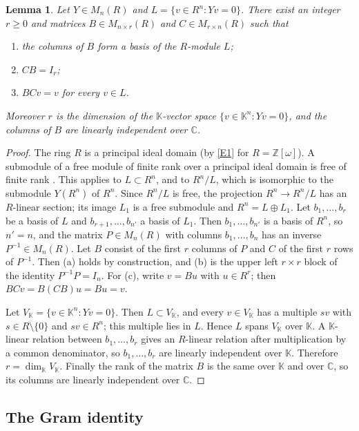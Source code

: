\documentclass[11pt,a4paper]{article}
\newtheorem{lemma}[theorem]{Lemma}
\theoremstyle{remark}
\newcommand{\ZZ}{\mathbb{Z}}
\newcommand{\CC}{\mathbb{C}}
\newcommand{\KK}{\mathbb{K}}
\begin{document}
\begin{lemma}\label{lem:basis}
Let $Y\in M_n(R)$ and $L=\{v\in R^n : Yv=0\}$. There exist an integer $r\ge0$ and matrices $B\in M_{n\times r}(R)$
and $C\in M_{r\times n}(R)$ such that
\begin{enumerate}[label=(\alph*)]
\item the columns of $B$ form a basis of the $R$-module $L$;
\item $CB=I_r$;
\item $BCv=v$ for every $v\in L$.
\end{enumerate}
Moreover $r$ is the dimension of the $\KK$-vector space $\{v\in\KK^n : Yv=0\}$, and the columns of $B$ are linearly
independent over $\CC$.
\end{lemma}
\begin{proof}
The ring $R$ is a principal ideal domain (by \ref{E1} for $R=\ZZ[\omega]$). A submodule of a free module of finite
rank over a principal ideal domain is free of finite rank \cite[Chapter~III, \S7]{La}. This applies to
$L\subset R^n$, and to $R^n/L$, which is isomorphic to the submodule $Y(R^n)$ of $R^n$. Since $R^n/L$ is free, the
projection $R^n\to R^n/L$ has an $R$-linear section; its image $L_1$ is a free submodule and $R^n=L\oplus L_1$. Let
$b_1,\dots,b_r$ be a basis of $L$ and $b_{r+1},\dots,b_{n'}$ a basis of $L_1$. Then $b_1,\dots,b_{n'}$ is a basis of
$R^n$, so $n'=n$, and the matrix $P\in M_n(R)$ with columns $b_1,\dots,b_n$ has an inverse $P^{-1}\in M_n(R)$. Let
$B$ consist of the first $r$ columns of $P$ and $C$ of the first $r$ rows of $P^{-1}$. Then (a) holds by
construction, and (b) is the upper left $r\times r$ block of the identity $P^{-1}P=I_n$. For (c), write $v=Bu$ with
$u\in R^r$; then $BCv=B(CB)u=Bu=v$.

Let $V_{\KK}=\{v\in\KK^n : Yv=0\}$. Then $L\subset V_{\KK}$, and every $v\in V_{\KK}$ has a multiple $sv$ with
$s\in R\setminus\{0\}$ and $sv\in R^n$; this multiple lies in $L$. Hence $L$ spans $V_{\KK}$ over $\KK$. A
$\KK$-linear relation between $b_1,\dots,b_r$ gives an $R$-linear relation after multiplication by a common
denominator, so $b_1,\dots,b_r$ are linearly independent over $\KK$. Therefore $r=\dim_{\KK}V_{\KK}$. Finally the
rank of the matrix $B$ is the same over $\KK$ and over $\CC$, so its columns are linearly independent over $\CC$.
\end{proof}

\subsection{The Gram identity}
\end{document}

